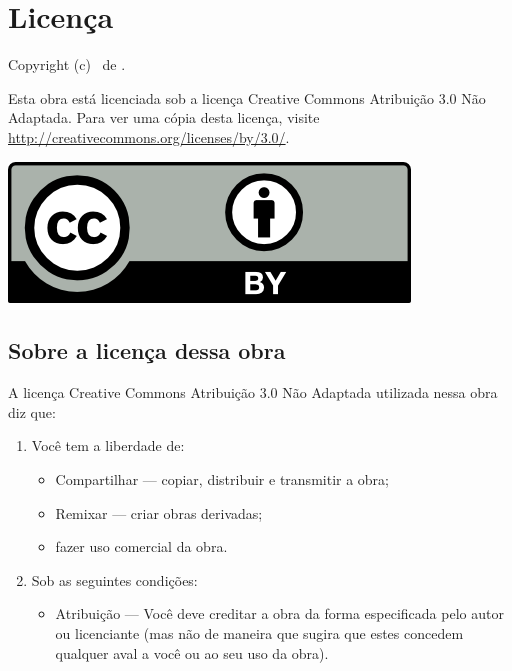 \chapter{Licença}
Copyright (c) \ano \ de \autor.

Esta obra está licenciada sob a licença Creative Commons Atribuição 3.0 Não
Adaptada. Para ver uma cópia desta licença, visite
\url{http://creativecommons.org/licenses/by/3.0/}.

\begin{center}
  \includegraphics{figuras/cc-by.png}
\end{center}

\section{Sobre a licença dessa obra}
A licença Creative Commons Atribuição 3.0 Não Adaptada utilizada nessa obra diz
que:
\begin{enumerate}
  \item Você tem a liberdade de:
    \begin{itemize}
      \item Compartilhar — copiar, distribuir e transmitir a obra;
      \item Remixar — criar obras derivadas;
      \item fazer uso comercial da obra.
    \end{itemize}
  \item Sob as seguintes condições:
    \begin{itemize}
      \item Atribuição — Você deve creditar a obra da forma especificada pelo
        autor ou licenciante (mas não de maneira que sugira que estes concedem
        qualquer aval a você ou ao seu uso da obra).
    \end{itemize}
\end{enumerate}
